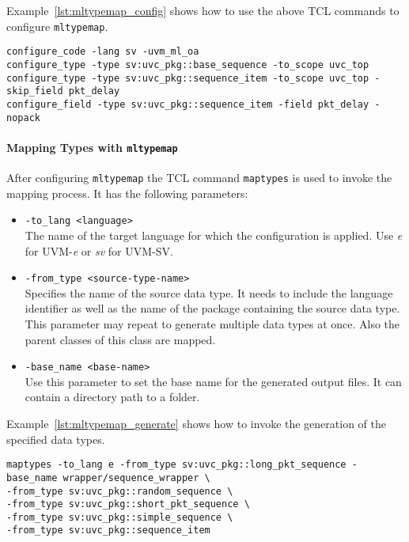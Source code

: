 Example~\ref{lst:mltypemap_config} shows how to use the above TCL commands to configure \lstinline$mltypemap$.
\begin{lstlisting}[frame=htrbl, caption={mltypemap: configuring the automatic data type generation}, label={lst:mltypemap_config}]
configure_code -lang sv -uvm_ml_oa
configure_type -type sv:uvc_pkg::base_sequence -to_scope uvc_top
configure_type -type sv:uvc_pkg::sequence_item -to_scope uvc_top -skip_field pkt_delay
configure_field -type sv:uvc_pkg::sequence_item -field pkt_delay -nopack
\end{lstlisting}

\paragraph{Mapping Types with \lstinline$mltypemap$} \label{mapping_mltypemap}
After configuring \lstinline$mltypemap$ the TCL command \lstinline$maptypes$ is used to invoke the mapping process. It has the following parameters:

\begin{itemize}
  \item{\lstinline$-to_lang <language>$}\\
  The name of the target language for which the configuration is applied. Use \emph{e} for UVM-\textit{e} or \emph{sv} for UVM-SV.
  \item{\lstinline$-from_type <source-type-name>$}\\
  Specifies the name of the source data type. It needs to include the language identifier as well as the name of the package containing the source data type. This parameter may repeat to generate multiple data types at once. Also the parent classes of this class are mapped.
  \item{\lstinline$-base_name <base-name>$}\\
  Use this parameter to set the base name for the generated output files. It can contain a directory path to a folder.
\end{itemize}

Example~\ref{lst:mltypemap_generate} shows how to invoke the generation of the specified data types.
\begin{lstlisting}[frame=htrbl, caption={mltypemap: invoking the automatic data type generation}, label={lst:mltypemap_generate}]
maptypes -to_lang e -from_type sv:uvc_pkg::long_pkt_sequence -base_name wrapper/sequence_wrapper \
-from_type sv:uvc_pkg::random_sequence \
-from_type sv:uvc_pkg::short_pkt_sequence \
-from_type sv:uvc_pkg::simple_sequence \
-from_type sv:uvc_pkg::sequence_item
\end{lstlisting}
